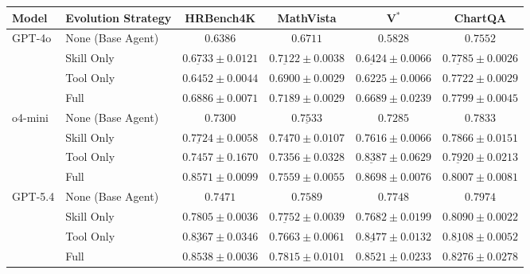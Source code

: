 \begin{table}[t]
\centering
\small
\setlength{\tabcolsep}{5pt}
\renewcommand{\arraystretch}{1.15}
\begin{tabular}{llcccc}
\toprule
\textbf{Model} & \textbf{Evolution Strategy}
  & \textbf{HRBench4K}
  & \textbf{MathVista}
  & \textbf{V$^*$}
  & \textbf{ChartQA} \\
\midrule

\multirow{4}{*}{GPT-4o}
  & None (Base Agent)  &$0.6386$  &$0.6711$  &$0.5828$  &$0.7552$  \\
  & Skill Only         &$\underline{0.6733} {\pm} 0.0121$  &$\underline{0.7122} {\pm} 0.0038$  &$\underline{0.6424} {\pm} 0.0066$  &$\underline{0.7785} {\pm} 0.0026$  \\
  & Tool Only          &$0.6452 {\pm} 0.0044$  &$0.6900 {\pm} 0.0029$  &$0.6225 {\pm} 0.0066$  & $0.7722 {\pm} 0.0029$  \\
  & Full               &$\mathbf{0.6886} {\pm} 0.0071$  &$\mathbf{0.7189} {\pm} 0.0029$  &$\mathbf{0.6689} {\pm} 0.0239$  &$\mathbf{0.7799} {\pm} 0.0045$  \\

\midrule

\multirow{4}{*}{o4-mini}
  & None (Base Agent)  &$0.7300$  &$\underline{0.7533}$  &$0.7285$  &$0.7833$  \\
  & Skill Only         &$\underline{0.7724} {\pm} 0.0058$  &$0.7470 {\pm} 0.0107$  &$0.7616 {\pm} 0.0066$  &$0.7866 {\pm} 0.0151$  \\
  & Tool Only          &$0.7457 {\pm} 0.1670$  &$0.7356 {\pm} 0.0328$  &$\underline{0.8387} {\pm} 0.0629$  & $\underline{0.7920} {\pm} 0.0213$  \\
  & Full               &$\mathbf{0.8571} {\pm} 0.0099$  &$\mathbf{0.7559} {\pm} 0.0055$  &$\mathbf{0.8698} {\pm} 0.0076$  &$\mathbf{0.8007} {\pm} 0.0081$  \\

\midrule

\multirow{4}{*}{GPT-5.4}
  & None (Base Agent)  &$0.7471$  &$0.7589$  &$0.7748$  &$0.7974$  \\
  & Skill Only         &$0.7805 {\pm} 0.0036$  &$\underline{0.7752} {\pm} 0.0039$  &$0.7682 {\pm} 0.0199$  &$0.8090 {\pm} 0.0022$  \\
  & Tool Only          &$\underline{0.8367} {\pm} 0.0346$  &$0.7663 {\pm} 0.0061$  &$\underline{0.8477} {\pm} 0.0132$  & $\underline{0.8108} {\pm} 0.0052$  \\
  & Full               &$\mathbf{0.8538} {\pm} 0.0036$  &$\mathbf{0.7815} {\pm} 0.0101$  &$\mathbf{0.8521} {\pm} 0.0233$  &$\mathbf{0.8276} {\pm} 0.0278$  \\


\end{tabular}
\end{table}
